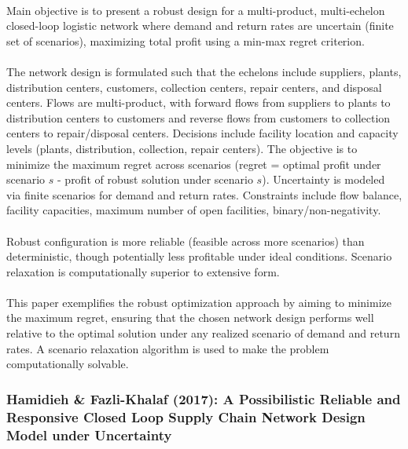 \paragraph{} Main objective is to present a robust design for a multi-product, multi-echelon closed-loop logistic network where demand and return rates are uncertain (finite set of scenarios), maximizing total profit using a min-max regret criterion.

\paragraph{} The network design is formulated such that the echelons include suppliers, plants, distribution centers, customers, collection centers, repair centers, and disposal centers. Flows are multi-product, with forward flows from suppliers to plants to distribution centers to customers and reverse flows from customers to collection centers to repair/disposal centers. Decisions include facility location and capacity levels (plants, distribution, collection, repair centers). The objective is to minimize the maximum regret across scenarios (regret = optimal profit under scenario $s$ - profit of robust solution under scenario $s$). Uncertainty is modeled via finite scenarios for demand and return rates. Constraints include flow balance, facility capacities, maximum number of open facilities, binary/non-negativity.

\paragraph{} Robust configuration is more reliable (feasible across more scenarios) than deterministic, though potentially less profitable under ideal conditions. Scenario relaxation is computationally superior to extensive form.

\paragraph{} This paper exemplifies the robust optimization approach by aiming to minimize the maximum regret, ensuring that the chosen network design performs well relative to the optimal solution under any realized scenario of demand and return rates. A scenario relaxation algorithm is used to make the problem computationally solvable.

\subsubsection{Hamidieh \& Fazli-Khalaf (2017): A Possibilistic Reliable and Responsive Closed Loop Supply Chain Network Design Model under Uncertainty}

